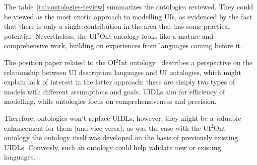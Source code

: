 The table~\ref{tab:ontologies-review} summarizes the ontologies reviewed.
They could be viewed as the most exotic approach to modelling UIs, as evidenced by the fact that there is only a single contribution in the area that has some practical potential.
Nevertheless, the UI$^{2}$Ont ontology looks like a mature and comprehensive work, building on experiences from languages coming before it.

The position paper related to the OI$^{2}$Int ontology~\cite{paulheim_formal_2011} describes a perspective on the relationship between UI description languages and UI ontologies, which might explain lack of interest in the latter approach:
these are simply two types of models with different assumptions and goals.
UIDLs aim for efficiency of modelling, while ontologies focus on comprehensiveness and precision.

Therefore, ontologies won't replace UIDLs; however, they might be a valuable enhancement for them (and vice versa), as was the case with the UI$^{2}$Ont ontology\,\textemdash\,the ontology itself was developed on the basis of previously existing UIDLs.
Conversly, such an ontology could help validate new or existing languages.
